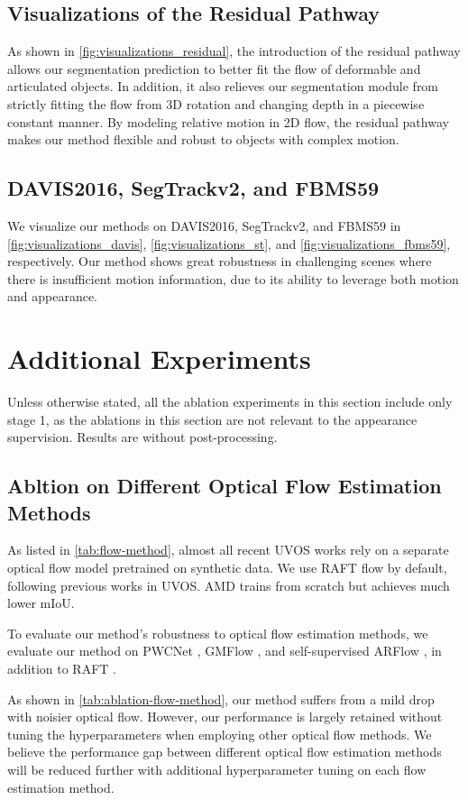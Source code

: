 \subsection{Visualizations of the Residual Pathway}
As shown in \cref{fig:visualizations_residual}, the introduction of the residual pathway allows our segmentation prediction to better fit the flow of deformable and articulated objects. In addition, it also relieves our segmentation module from strictly fitting the flow from 3D rotation and changing depth in a piecewise constant manner. By modeling relative motion in 2D flow, the residual pathway makes our method flexible and robust to objects with complex motion.

\subsection{DAVIS2016, SegTrackv2, and FBMS59}
We visualize our methods on DAVIS2016, SegTrackv2, and FBMS59 in \cref{fig:visualizations_davis}, \cref{fig:visualizations_st}, and \cref{fig:visualizations_fbms59}, respectively. Our method shows great robustness in challenging scenes where there is insufficient motion information, due to its ability to leverage both motion and appearance.


\section{Additional Experiments}
Unless otherwise stated, all the ablation experiments in this section include only stage 1, as the ablations in this section are not relevant to the appearance supervision. Results are without post-processing.

\subsection{Abltion on Different Optical Flow Estimation Methods}
As listed in \cref{tab:flow-method}, almost all recent UVOS works rely on a separate optical flow model pretrained on synthetic data. We use RAFT \cite{teed2020raft} flow by default, following previous works in UVOS. AMD trains \cite{sun2017pwc} from scratch but achieves much lower mIoU.

To evaluate our method's robustness to optical flow estimation methods, we evaluate our method on PWCNet \cite{sun2017pwc}, GMFlow \cite{xu2022gmflow}, and self-supervised ARFlow \cite{liu2020learning}, in addition to RAFT \cite{teed2020raft}.

As shown in \cref{tab:ablation-flow-method}, our method suffers from a mild drop with noisier optical flow. However, our performance is largely retained without tuning the hyperparameters when employing other optical flow methods. We believe the performance gap between different optical flow estimation methods will be reduced further with additional hyperparameter tuning on each flow estimation method.

